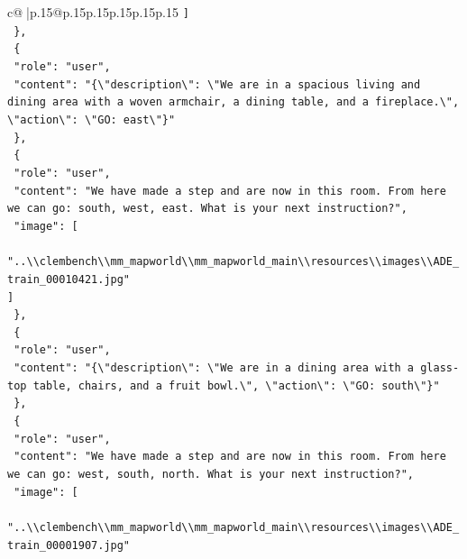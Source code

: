 \documentclass{article}
\begin{document}
{\begin{supertabular}{c@{$\;$}|p{.15\linewidth}@{}p{.15\linewidth}p{.15\linewidth}p{.15\linewidth}p{.15\linewidth}p{.15\linewidth}}
{{{\texttt{    {]}} \\
\texttt{  \},} \\
\texttt{  \{} \\
\texttt{    "role": "user",} \\
\texttt{    "content": "\{\textbackslash{}"description\textbackslash{}": \textbackslash{}"We are in a spacious living and dining area with a woven armchair, a dining table, and a fireplace.\textbackslash{}", \textbackslash{}"action\textbackslash{}": \textbackslash{}"GO: east\textbackslash{}"\}"} \\
\texttt{  \},} \\
\texttt{  \{} \\
\texttt{    "role": "user",} \\
\texttt{    "content": "We have made a step and are now in this room. From here we can go: south, west, east. What is your next instruction?",} \\
\texttt{    "image": {[}} \\
\texttt{      "..\textbackslash{}\textbackslash{}clembench\textbackslash{}\textbackslash{}mm\_mapworld\textbackslash{}\textbackslash{}mm\_mapworld\_main\textbackslash{}\textbackslash{}resources\textbackslash{}\textbackslash{}images\textbackslash{}\textbackslash{}ADE\_train\_00010421.jpg"} \\
\texttt{    {]}} \\
\texttt{  \},} \\
\texttt{  \{} \\
\texttt{    "role": "user",} \\
\texttt{    "content": "\{\textbackslash{}"description\textbackslash{}": \textbackslash{}"We are in a dining area with a glass{-}top table, chairs, and a fruit bowl.\textbackslash{}", \textbackslash{}"action\textbackslash{}": \textbackslash{}"GO: south\textbackslash{}"\}"} \\
\texttt{  \},} \\
\texttt{  \{} \\
\texttt{    "role": "user",} \\
\texttt{    "content": "We have made a step and are now in this room. From here we can go: west, south, north. What is your next instruction?",} \\
\texttt{    "image": {[}} \\
\texttt{      "..\textbackslash{}\textbackslash{}clembench\textbackslash{}\textbackslash{}mm\_mapworld\textbackslash{}\textbackslash{}mm\_mapworld\_main\textbackslash{}\textbackslash{}resources\textbackslash{}\textbackslash{}images\textbackslash{}\textbackslash{}ADE\_train\_00001907.jpg"} \\
}}}
\end{supertabular}}
\end{document}
